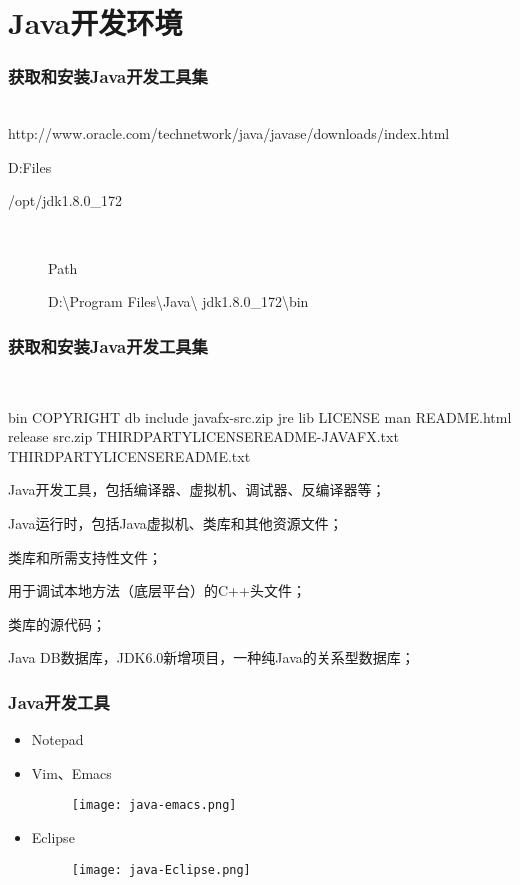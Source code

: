 \section{Java开发环境}
\begin{frame}[fragile] %
\frametitle{获取和安装Java开发工具集}
\\
http://www.oracle.com/technetwork/java/javase/downloads/index.html
\\
\begin{shCode}
D:\Program Files\Java
\end{shCode}
\begin{shCode}
/opt/jdk1.8.0_172
\end{shCode}
\\
\begin{description}
\item[] Path
\item[] D:\textbackslash Program Files\textbackslash Java\textbackslash
  jdk1.8.0\_172\textbackslash bin
\end{description}
\end{frame}

\begin{frame}[fragile] %
\frametitle{获取和安装Java开发工具集}
\\
\begin{shCode}
  bin  COPYRIGHT  db  include  javafx-src.zip
  jre  lib  LICENSE  man  README.html  release  src.zip
  THIRDPARTYLICENSEREADME-JAVAFX.txt  THIRDPARTYLICENSEREADME.txt  
\end{shCode}
\begin{description}\scriptsize
\item[\fbox{bin}] Java开发工具，包括编译器、虚拟机、调试器、反编译器等；
\item[\fbox{jre}] Java运行时，包括Java虚拟机、类库和其他资源文件；
\item[\fbox{lib}] 类库和所需支持性文件；
\item[\fbox{include}] 用于调试本地方法（底层平台）的C++头文件；
\item[\fbox{src.zip}] 类库的源代码；
\item[\fbox{db}] Java DB数据库，JDK6.0新增项目，一种纯Java的关系型数据库；
\end{description}
\end{frame}

\begin{frame}[fragile] %
\frametitle{Java开发工具}
\begin{itemize}
\item Notepad
\item Vim、Emacs
\begin{figure}
\centering
\texttt{[image: java-emacs.png]}
\end{figure}
\item {\Red Eclipse}
\begin{figure}
\centering
\texttt{[image: java-Eclipse.png]}
\end{figure}
\end{itemize}
\end{frame}

